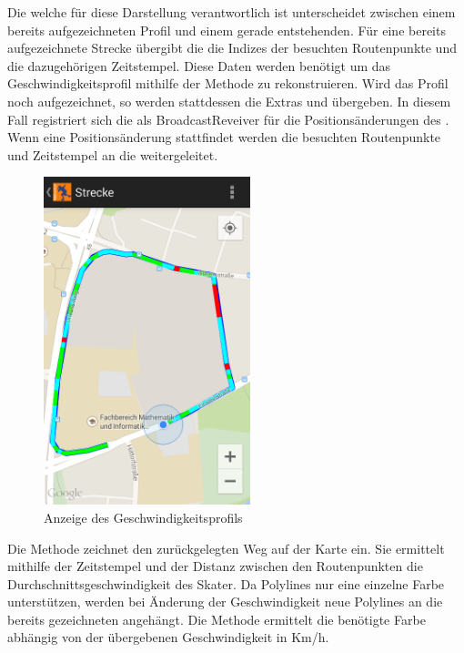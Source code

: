 Die  welche für diese Darstellung verantwortlich ist unterscheidet zwischen einem bereits aufgezeichneten Profil und einem gerade entstehenden. Für eine bereits aufgezeichnete Strecke übergibt die  die Indizes der besuchten Routenpunkte und die dazugehörigen Zeitstempel. Diese Daten werden benötigt um das Geschwindigkeitsprofil mithilfe der  Methode zu rekonstruieren. Wird das Profil noch aufgezeichnet, so werden stattdessen die Extras  und  übergeben. In diesem Fall registriert sich die  als BroadcastReveiver für die Positionsänderungen des . Wenn eine Positionsänderung stattfindet werden die besuchten Routenpunkte und Zeitstempel an die  weitergeleitet.

\begin{figure}[htb]
\centering
\includegraphics[width=6cm]{graphics/LokaleAuswertung_GeschwindigkeitsProfil.png}
\caption{Anzeige des Geschwindigkeitsprofils}
\label{fig:LokaleAuswertungGeschwindigkeitsprofil}
\end{figure}

Die  Methode zeichnet den zurückgelegten Weg auf der Karte ein. Sie ermittelt mithilfe der Zeitstempel und der Distanz zwischen den Routenpunkten die Durchschnittsgeschwindigkeit des Skater. Da Polylines nur eine einzelne Farbe unterstützen, werden bei Änderung der Geschwindigkeit neue Polylines an die bereits gezeichneten angehängt. Die Methode  ermittelt die benötigte Farbe abhängig von der übergebenen Geschwindigkeit in Km/h.

